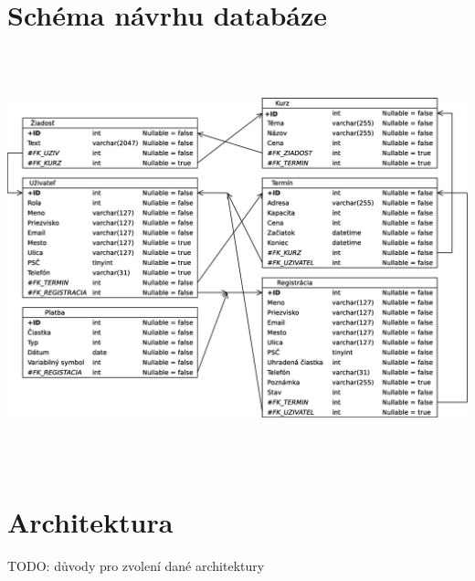 \documentclass[12pt,a4paper,titlepage,final]{report}
\begin{document}
		\section{Schéma návrhu databáze}
		\begin{center}
			\captionsetup{type=figure}
			\includegraphics[height=12cm]{img/schema_db.eps}
		\end{center}
		
\newpage		
		
		\section{Architektura}

		TODO: důvody pro zvolení dané architektury
		
\end{document}
